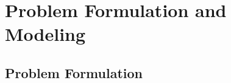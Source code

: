 \documentclass[a4paper]{article}
\begin{document}


%

\section{Problem Formulation and Modeling}


%
%


\subsection{Problem Formulation}

\end{document}

